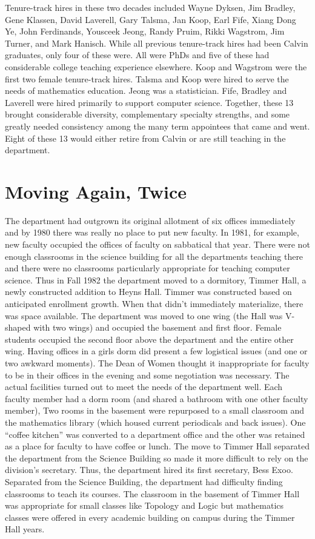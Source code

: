 \documentclass[
]{book}
\begin{document}
Tenure-track hires in these two decades included Wayne Dyksen, Jim Bradley, Gene Klassen, David Laverell, Gary Talsma, Jan Koop, Earl Fife, Xiang Dong Ye, John Ferdinands, Yousceek Jeong, Randy Pruim, Rikki Wagstrom, Jim Turner, and Mark Hanisch. While all previous tenure-track hires had been Calvin graduates, only four of these were. All were PhDs and five of these had considerable college teaching experience elsewhere. Koop and Wagstrom were the first two female tenure-track hires. Talsma and Koop were hired to serve the needs of mathematics education. Jeong was a statistician. Fife, Bradley and Laverell were hired primarily to support computer science. Together, these 13 brought considerable diversity, complementary specialty strengths, and some greatly needed consistency among the many term appointees that came and went.
Eight of these 13 would either retire from Calvin or are still teaching in the department.

\hypertarget{moving-again-twice}{%
\section{Moving Again, Twice}\label{moving-again-twice}}

The department had outgrown its original allotment of six offices immediately and by 1980 there was really no place to put new faculty. In 1981, for example, new faculty occupied the offices of faculty on sabbatical that year. There were not enough classrooms in the science building for all the departments teaching there and there were no classrooms particularly appropriate for teaching computer science. Thus in Fall 1982 the department moved to a dormitory, Timmer Hall, a newly constructed addition to Heyns Hall. Timmer was constructed based on anticipated enrollment growth. When that didn't immediately materialize, there was space available. The department was moved to one wing (the Hall was V-shaped with two wings) and occupied the basement and first floor. Female students occupied the second floor above the department and the entire other wing. Having offices in a girls dorm did present a few logistical issues (and one or two awkward moments). The Dean of Women thought it inappropriate for faculty to be in their offices in the evening and some negotiation was necessary. The actual facilities turned out to meet the needs of the department well. Each faculty member had a dorm room (and shared a bathroom with one other faculty member), Two rooms in the basement were repurposed to a small classroom and the mathematics library (which housed current periodicals and back issues). One ``coffee kitchen'' was converted to a department office and the other was retained as a place for faculty to have coffee or lunch. The move to Timmer Hall separated the department from the Science Building so made it more difficult to rely on the division's secretary. Thus, the department hired its first secretary, Bess Exoo. Separated from the Science Building, the department had difficulty finding classrooms to teach its courses. The classroom in the basement of Timmer Hall was appropriate for small classes like Topology and Logic but mathematics classes were offered in every academic building on campus during the Timmer Hall years.
\end{document}
